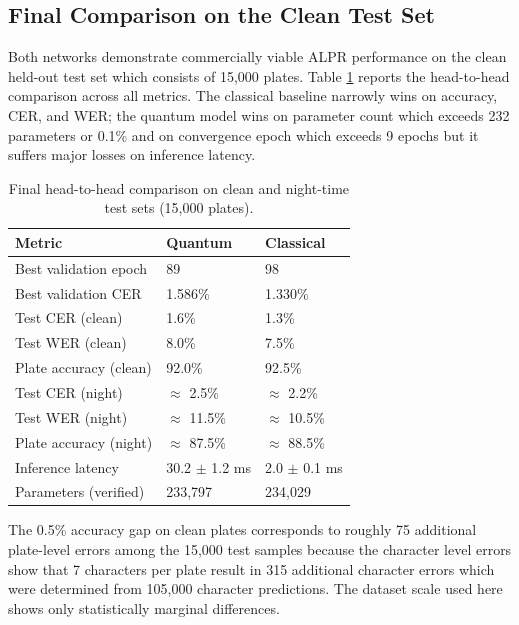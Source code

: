 \documentclass[preprint,12pt]{elsarticle}
\begin{document}
\subsection{Final Comparison on the Clean Test Set}
Both networks demonstrate commercially viable ALPR performance on the clean held-out test set which consists of 15,000 plates. Table \ref{tab:comparison} reports the head-to-head comparison across all metrics. The classical baseline narrowly wins on accuracy, CER, and WER; the quantum model wins on parameter count which exceeds 232 parameters or 0.1\% and on convergence epoch which exceeds 9 epochs but it suffers major losses on inference latency.

\begin{table}[h]
\centering
\caption{Final head-to-head comparison on clean and night-time test sets (15,000 plates).}
\label{tab:comparison}
\begin{tabularx}{\columnwidth}{@{}lXX@{}}
\toprule
\textbf{Metric} & \textbf{Quantum} & \textbf{Classical} \\
\midrule
Best validation epoch & 89 & 98 \\
Best validation CER & 1.586\% & 1.330\% \\
Test CER (clean) & 1.6\% & 1.3\% \\
Test WER (clean) & 8.0\% & 7.5\% \\
Plate accuracy (clean) & 92.0\% & 92.5\% \\
Test CER (night) & $\approx$ 2.5\% & $\approx$ 2.2\% \\
Test WER (night) & $\approx$ 11.5\% & $\approx$ 10.5\% \\
Plate accuracy (night) & $\approx$ 87.5\% & $\approx$ 88.5\% \\
Inference latency & 30.2 $\pm$ 1.2 ms & 2.0 $\pm$ 0.1 ms \\
Parameters (verified) & 233,797 & 234,029 \\
\bottomrule
\end{tabularx}
\end{table}

The 0.5\% accuracy gap on clean plates corresponds to roughly 75 additional plate-level errors among the 15,000 test samples because the character level errors show that 7 characters per plate result in 315 additional character errors which were determined from 105,000 character predictions. The dataset scale used here shows only statistically marginal differences.
\end{document}
